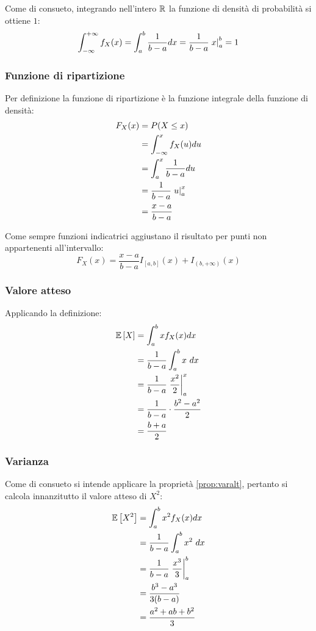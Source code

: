 Come di consueto, integrando nell'intero $\mathbb R$ la funzione di densità di probabilità si ottiene $1$:
\begin{equation*}
	\int_{-\infty}^{+\infty}f_X(x) = \int_a^b\frac{1}{b-a}dx = \frac{1}{b-a} \left. x \right\rvert_{a}^{b} = 1
\end{equation*}


\subsubsection{Funzione di ripartizione}
Per definizione la funzione di ripartizione è la funzione integrale della funzione di densità:
\begin{align*}
	F_X(x) & = P(X\leq x)                   \\
	       & = \int_{-\infty}^x f_X(u)du    \\
	       & = \int_a^x \frac{1}{b-a}du     \\
	       & = \frac{1}{b-a} \left. u \right\rvert_{a}^{x} \\
	       & = \frac{x-a}{b-a}
\end{align*}

Come sempre funzioni indicatrici aggiustano il risultato per punti non appartenenti all'intervallo:
\begin{equation*}
	F_X(x) = \frac{x-a}{b-a} I_{[a,b]}(x) + I_{(b,+\infty)}(x)
\end{equation*}


\subsubsection{Valore atteso}
Applicando la definizione:
\begin{align*}
	\mathbb{E}\left[ X \right] & = \int_a^b x f_X(x)dx                      \\
	       & = \frac{1}{b-a} \int_a^b x ~ dx            \\
	       & = \frac{1}{b-a} \left. \frac{x^2}{2} \right\rvert_{a}^{x} \\
	       & = \frac{1}{b-a} \cdot \frac{b^2-a^2}{2}    \\
	       & = \frac{b+a}{2}
\end{align*}


\subsubsection{Varianza}
Come di consueto si intende applicare la proprietà \ref{prop:varalt}, pertanto si calcola innanzitutto il valore atteso di $X^2$:
\begin{align*}
	\mathbb{E}\left[ X^2 \right] & = \int_a^b x^2 f_X(x)dx                    \\
	         & = \frac{1}{b-a}\int_a^b x^2 ~ dx           \\
	         & = \frac{1}{b-a} \left. \frac{x^3}{3} \right\rvert_{a}^{b} \\
	         & = \frac{b^3-a^3}{3(b-a)}                   \\
	         & = \frac{a^2+ab+b^2}{3}
\end{align*}

